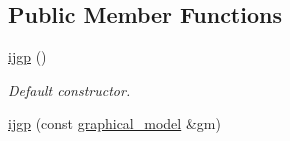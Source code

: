 \subsection*{Public Member Functions}
\begin{DoxyCompactItemize}
\item 
\hypertarget{classmerlin_1_1ijgp_aeb0d9c018731a8bb51b5b0c3adb3ecfd}{}\hyperlink{classmerlin_1_1ijgp_aeb0d9c018731a8bb51b5b0c3adb3ecfd}{ijgp} ()\label{classmerlin_1_1ijgp_aeb0d9c018731a8bb51b5b0c3adb3ecfd}

\begin{DoxyCompactList}\small\item\em Default constructor. \end{DoxyCompactList}\item 
\hypertarget{classmerlin_1_1ijgp_ac2c784827467ac082b34f717ed5a8b28}{}\hyperlink{classmerlin_1_1ijgp_ac2c784827467ac082b34f717ed5a8b28}{ijgp} (const \hyperlink{classmerlin_1_1graphical__model}{graphical\+\_\+model} \&gm)\label{classmerlin_1_1ijgp_ac2c784827467ac082b34f717ed5a8b28}


\end{DoxyCompactItemize}
